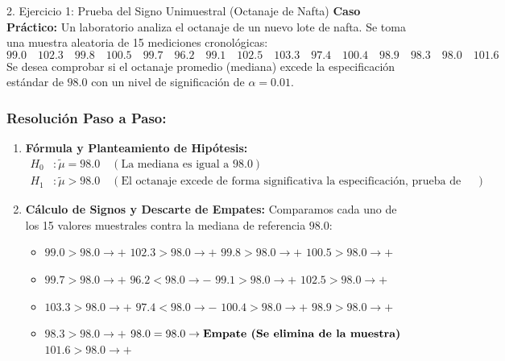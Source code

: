 \documentclass[11pt,a4paper]{article}
\begin{document}
\begin{subsection}{2. Ejercicio 1: Prueba del Signo Unimuestral (Octanaje de Nafta)}
    \textbf{Caso Práctico:} Un laboratorio analiza el octanaje de un nuevo lote de nafta. Se toma una muestra aleatoria de 15 mediciones cronológicas:
    \[ 99.0 \quad 102.3 \quad 99.8 \quad 100.5 \quad 99.7 \quad 96.2 \quad 99.1 \quad 102.5 \quad 103.3 \quad 97.4 \quad 100.4 \quad 98.9 \quad 98.3 \quad 98.0 \quad 101.6 \]
    Se desea comprobar si el octanaje promedio (mediana) excede la especificación estándar de $98.0$ con un nivel de significación de $\alpha = 0.01$.

    \subsubsection*{Resolución Paso a Paso:}
    \begin{enumerate}
        \item \textbf{Fórmula y Planteamiento de Hipótesis:}
              \begin{align*}
                  H_0&: \tilde{\mu} = 98.0 \quad (\text{La mediana es igual a 98.0}) \\
                  H_1&: \tilde{\mu} > 98.0 \quad (\text{El octanaje excede de forma significativa la especificación, prueba de cola derecha})
              \end{align*}
        \item \textbf{Cálculo de Signos y Descarte de Empates:}
              Comparamos cada uno de los 15 valores muestrales contra la mediana de referencia $98.0$:
              \begin{itemize}
                  \item $99.0 > 98.0 \rightarrow \mathbf{+}$ \quad $102.3 > 98.0 \rightarrow \mathbf{+}$ \quad $99.8 > 98.0 \rightarrow \mathbf{+}$ \quad $100.5 > 98.0 \rightarrow \mathbf{+}$
                  \item $99.7 > 98.0 \rightarrow \mathbf{+}$ \quad $96.2 < 98.0 \rightarrow \mathbf{-}$ \quad $99.1 > 98.0 \rightarrow \mathbf{+}$ \quad $102.5 > 98.0 \rightarrow \mathbf{+}$
                  \item $103.3 > 98.0 \rightarrow \mathbf{+}$ \quad $97.4 < 98.0 \rightarrow \mathbf{-}$ \quad $100.4 > 98.0 \rightarrow \mathbf{+}$ \quad $98.9 > 98.0 \rightarrow \mathbf{+}$
                  \item $98.3 > 98.0 \rightarrow \mathbf{+}$ \quad $98.0 = 98.0 \rightarrow \text{\textbf{Empate (Se elimina de la muestra)}}$ \quad $101.6 > 98.0 \rightarrow \mathbf{+}$

\end{itemize}
\end{enumerate}
\end{subsection}
\end{document}
